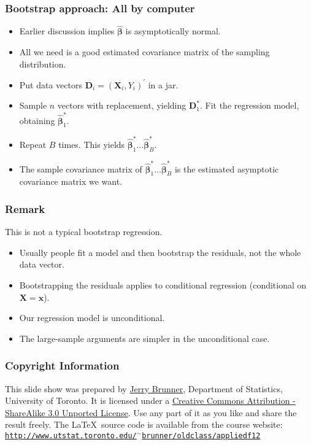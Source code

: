 \documentclass[serif]{beamer} %
\begin{document}
\begin{frame}
\frametitle{Bootstrap approach: All by computer}
  \begin{itemize}
    \item Earlier discussion implies $\widehat{\boldsymbol{\beta}}$ is asymptotically normal.
    \item All we need is a good estimated covariance matrix of the sampling distribution.
    \item Put data vectors $\mathbf{D}_i = (\mathbf{X}_i,Y_i)^\prime$ in a jar.
    \item Sample $n$ vectors with replacement, yielding $\mathbf{D}_1^*$. Fit the regression model, obtaining $\widehat{\boldsymbol{\beta}}^*_1$.
    \item Repeat $B$ times. This yields $\widehat{\boldsymbol{\beta}}^*_1 \ldots \widehat{\boldsymbol{\beta}}^*_B$.
    \item The sample covariance matrix of $\widehat{\boldsymbol{\beta}}^*_1 \ldots \widehat{\boldsymbol{\beta}}^*_B$ is the estimated asymptotic covariance matrix we want.
  \end{itemize}
\end{frame}

\begin{frame}
\frametitle{Remark}
This is not a typical bootstrap regression.
  \begin{itemize}
    \item Usually people fit a model and then bootstrap the residuals, not the whole data vector.
    \item Bootstrapping the residuals applies to conditional regression (conditional on $\mathbf{X}=\mathbf{x}$).
    \item Our regression model is unconditional.
    \item The large-sample arguments are simpler in the unconditional case. 
  \end{itemize}
\end{frame}



\begin{frame}
\frametitle{Copyright Information}

This slide show was prepared by  \href{http://www.utstat.toronto.edu/~brunner}{Jerry Brunner},
Department of Statistics, University of Toronto. It is licensed under a 
\href{http://creativecommons.org/licenses/by-sa/3.0/deed.en_US}
     {Creative Commons Attribution - ShareAlike 3.0 Unported License}. Use any part of it as you like and share the result freely. The \LaTeX~source code is available from the course website:
\href{http://www.utstat.toronto.edu/~brunner/oldclass/appliedf12} {\small\texttt{http://www.utstat.toronto.edu/$^\sim$brunner/oldclass/appliedf12}}





\end{frame}
\end{document}

